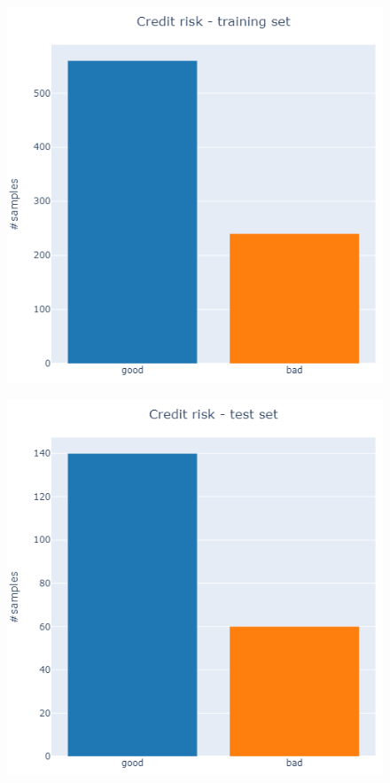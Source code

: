 \documentclass[letterpaper]{article}
\begin{document}
	\begin{figure}[!h]
		\centering
		\begin{minipage}[c]{0.40\textwidth}
			\includegraphics[width=\textwidth]{images/training_set.png}
			\label{fig:9}
		\end{minipage}
		\begin{minipage}{0.05\textwidth}
			\quad
		\end{minipage}
		\begin{minipage}[c]{0.40\textwidth}
			\includegraphics[width=\textwidth]{images/test_set.png}
			\label{fig:10}
		\end{minipage}
	\end{figure}
	
\end{document}
